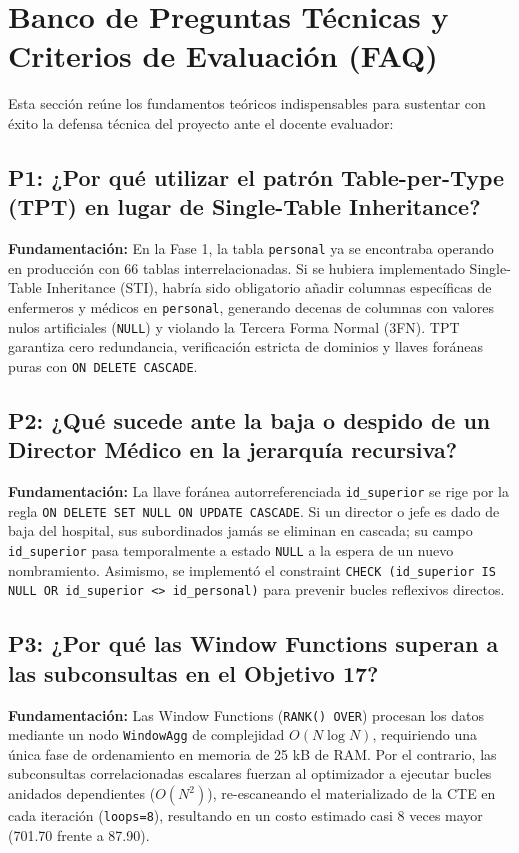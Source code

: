 \documentclass[11pt,a4paper]{article}
\begin{document}
\section{Banco de Preguntas Técnicas y Criterios de Evaluación (FAQ)}
Esta sección reúne los fundamentos teóricos indispensables para sustentar con éxito la defensa técnica del proyecto ante el docente evaluador:

\subsection{P1: ¿Por qué utilizar el patrón Table-per-Type (TPT) en lugar de Single-Table Inheritance?}
\textbf{Fundamentación:} En la Fase 1, la tabla \texttt{personal} ya se encontraba operando en producción con 66 tablas interrelacionadas. Si se hubiera implementado Single-Table Inheritance (STI), habría sido obligatorio añadir columnas específicas de enfermeros y médicos en \texttt{personal}, generando decenas de columnas con valores nulos artificiales (\texttt{NULL}) y violando la Tercera Forma Normal (3FN). TPT garantiza cero redundancia, verificación estricta de dominios y llaves foráneas puras con \texttt{ON DELETE CASCADE}.

\subsection{P2: ¿Qué sucede ante la baja o despido de un Director Médico en la jerarquía recursiva?}
\textbf{Fundamentación:} La llave foránea autorreferenciada \texttt{id\_superior} se rige por la regla \texttt{ON DELETE SET NULL ON UPDATE CASCADE}. Si un director o jefe es dado de baja del hospital, sus subordinados jamás se eliminan en cascada; su campo \texttt{id\_superior} pasa temporalmente a estado \texttt{NULL} a la espera de un nuevo nombramiento. Asimismo, se implementó el constraint \texttt{CHECK (id\_superior IS NULL OR id\_superior <> id\_personal)} para prevenir bucles reflexivos directos.

\subsection{P3: ¿Por qué las Window Functions superan a las subconsultas en el Objetivo 17?}
\textbf{Fundamentación:} Las Window Functions (\texttt{RANK() OVER}) procesan los datos mediante un nodo \texttt{WindowAgg} de complejidad $O(N \log N)$, requiriendo una única fase de ordenamiento en memoria de 25 kB de RAM. Por el contrario, las subconsultas correlacionadas escalares fuerzan al optimizador a ejecutar bucles anidados dependientes ($O(N^2)$), re-escaneando el materializado de la CTE en cada iteración (\texttt{loops=8}), resultando en un costo estimado casi 8 veces mayor (701.70 frente a 87.90).
\end{document}
